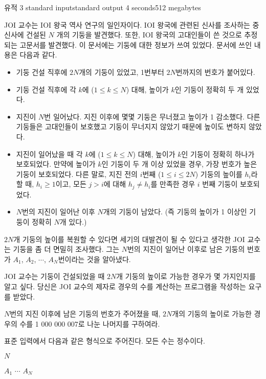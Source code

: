 \begin{problem}{유적 3}
	{standard input}{standard output}
	{4 seconds}{512 megabytes}{}
	
	JOI 교수는 IOI 왕국 역사 연구의 일인자이다. IOI 왕국에 관련된 신사를 조사하는 중 신사에 건설된 $N$ 개의 기둥을 발견했다. 또한, IOI 왕국의 고대인들이 쓴 것으로 추정되는 고문서를 발견했다. 이 문서에는 기둥에 대한 정보가 쓰여 있었다. 문서에 쓰인 내용은 다음과 같다.
	
	\begin{itemize}
		\item 기둥 건설 직후에 $2N$개의 기둥이 있었고, 1번부터 $2N$번까지의 번호가 붙어있다.
		\item 기둥 건설 직후에 각 $k$에 ($1 \le k \le N$) 대해, 높이가 $k$인 기둥이 정확히 두 개 있었다.
		\item 지진이 $N$번 일어났다. 지진 이후에 몇몇 기둥은 무너졌고 높이가 1 감소했다. 다른 기둥들은 고대인들이 보호했고 기둥이 무너지지 않았기 때문에 높이도 변하지 않았다.
		\item 지진이 일어났을 때 각 $k$에 ($1 \le k \le N$) 대해, 높이가 $k$인 기둥이 정확히 하나가 보호되었다. 만약에 높이가 $k$인 기둥이 두 개 이상 있었을 경우, 가장 번호가 높은 기둥이 보호되었다. 다른 말로, 지진 전의 $i$번째 ($1 \le i \le 2N$) 기둥의 높이를 $h_i$라 할 때, $h_i \ge 1$이고, 모든 $j>i$에 대해 $h_j \ne h_i$를 만족한 경우 $i$ 번째 기둥이 보호되었다.
		\item $N$번의 지진이 일어난 이후 $N$개의 기둥이 남았다. (즉 기둥의 높이가 1 이상인 기둥이 정확히 $N$개 있다.)
	\end{itemize}

	$2N$개 기둥의 높이를 복원할 수 있다면 세기의 대발견이 될 수 있다고 생각한 JOI 교수는 기둥을 좀 더 면밀히 조사했다. 그는 $N$번의 지진이 일어난 이후로 남은 기둥의 번호가 $A_1$, $A_2$, $\cdots$, $A_N$번이라는 것을 알아냈다.
	
	JOI 교수는 기둥이 건설되었을 때 $2N$개 기둥의 높이로 가능한 경우가 몇 가지인지를 알고 싶다. 당신은 JOI 교수의 제자로 경우의 수를 계산하는 프로그램을 작성하는 요구를 받았다.
	
	$N$번의 지진 이후에 남은 기둥의 번호가 주어졌을 때, $2N$개의 기둥의 높이로 가능한 경우의 수를 1 000 000 007로 나눈 나머지를 구하여라.
	
	\InputFile
	
	표준 입력에서 다음과 같은 형식으로 주어진다. 모든 수는 정수이다.
	
	$N$
	
	$A_1$ $\cdots$ $A_N$
	
	\OutputFile
	

\end{problem}
